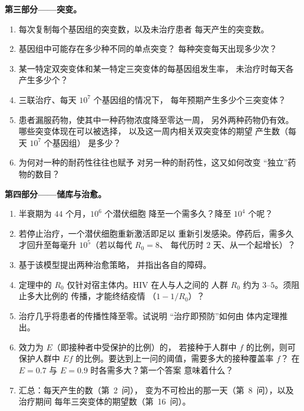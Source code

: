 \begin{problem}
\medskip
\noindent\textbf{第三部分——突变。}
\begin{enumerate}[resume]
  \item 每次复制每个基因组的突变数，以及未治疗患者
        每天产生的突变数。
  \item 基因组中可能存在多少种不同的单点突变？
        每种突变每天出现多少次？
  \item 某一特定双突变体和某一特定三突变体的每基因组发生率，
        未治疗时每天各产生多少个？
  \item 三联治疗、每天 $10^{7}$ 个基因组的情况下，
        每年预期产生多少个三突变体？
  \item 患者漏服药物，使其中一种药物浓度降至零达一周，
        另外两种药物仍有效。哪些突变体现在可以被选择，
        以及这一周内相关双突变体的期望
        产生数（每天 $10^{7}$ 个基因组）
        是多少？
  \item 为何对一种的耐药性往往也赋予
        对另一种的耐药性，这又如何改变
        “独立”药物的数目？
\end{enumerate}

\medskip
\noindent\textbf{第四部分——储库与治愈。}
\begin{enumerate}[resume]
  \item 半衰期为 $44$ 个月，$10^{6}$ 个潜伏细胞
        降至一个需多久？降至 $10^{4}$ 个呢？
  \item 若停止治疗，一个潜伏细胞重新激活即足以
        重新引发感染。停药后，需多久
        才回升至每毫升 $10^{5}$（若以每代 $R_{0} = 8$、
        每代历时 $2$ 天、从一个起增长）？
  \item 基于该模型提出两种治愈策略，
        并指出各自的障碍。
  \item 定理中的 $R_{0}$ 仅针对宿主体内。HIV 在人与人之间的
        人群 $R_{0}$ 约为 $3$--$5$。须阻止多大比例的
        传播，才能终结疫情
        （$1 - 1/R_{0}$）？
  \item 治疗几乎将患者的传播性降至零。试说明
        “治疗即预防”如何由
        体内定理推出。
  \item 效力为 $E$（即接种者中受保护的比例）的，
        若接种于人群中 $f$ 的比例，则可保护人群中
        $Ef$ 的比例。要达到上一问的阈值，需要多大的接种覆盖率 $f$？
        在 $E = 0.7$ 与 $E = 0.9$ 时各需多大？第一个答案
        意味着什么？
  \item 汇总：每天产生的数（第~2~问），
        变为不可检出的那一天（第~8~问），以及治疗期间
        每年三突变体的期望数（第~16~问）。
\end{enumerate}
\end{problem}
